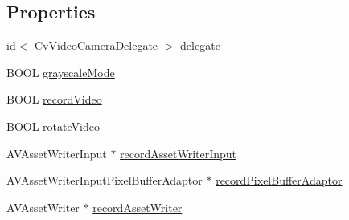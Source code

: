 \subsection*{Properties}
\begin{DoxyCompactItemize}
\item 
id$<$ \hyperlink{protocolCvVideoCameraDelegate-p}{Cv\-Video\-Camera\-Delegate} $>$ \hyperlink{interfaceCvVideoCamera_a34e036fdee24dcf4e0ca57e938b77cbd}{delegate}
\item 
B\-O\-O\-L \hyperlink{interfaceCvVideoCamera_a940a9a17e136c091351db1f63e9fcacd}{grayscale\-Mode}
\item 
B\-O\-O\-L \hyperlink{interfaceCvVideoCamera_a7a2d067e74a18cd9cc5ee7626ac27660}{record\-Video}
\item 
B\-O\-O\-L \hyperlink{interfaceCvVideoCamera_a506e54c016c4fccb68eed2fe088e3929}{rotate\-Video}
\item 
A\-V\-Asset\-Writer\-Input $\ast$ \hyperlink{interfaceCvVideoCamera_a5331ee5ef533abefa38a44580f6e45f2}{record\-Asset\-Writer\-Input}
\item 
A\-V\-Asset\-Writer\-Input\-Pixel\-Buffer\-Adaptor $\ast$ \hyperlink{interfaceCvVideoCamera_a9bf206f012ee17fbcb79b9f57ae27cb0}{record\-Pixel\-Buffer\-Adaptor}
\item 
A\-V\-Asset\-Writer $\ast$ \hyperlink{interfaceCvVideoCamera_a821ccd31c8a2260fe0292b9b4ae9cb3a}{record\-Asset\-Writer}
\end{DoxyCompactItemize}


